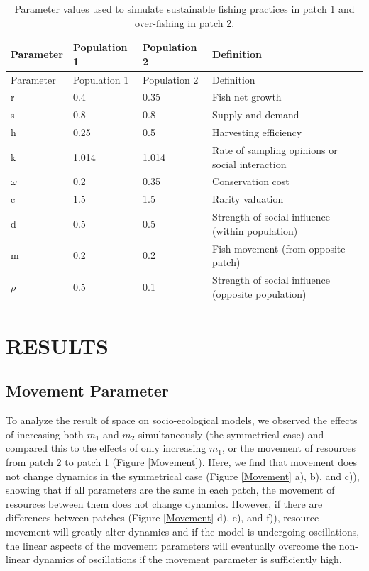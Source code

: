 \documentclass[
  12pt,
]{article}
\begin{document}
\begin{longtable}[]{@{}llll@{}}
\caption{\label{tab:DispersionParamTable}Parameter values used to simulate sustainable fishing practices in patch 1 and over-fishing in patch 2. \label{DispersionParamTable}}\tabularnewline
\toprule\noalign{}
Parameter & Population 1 & Population 2 & Definition \\
\midrule\noalign{}
\endfirsthead
\toprule\noalign{}
Parameter & Population 1 & Population 2 & Definition \\
\midrule\noalign{}
\endhead
\bottomrule\noalign{}
\endlastfoot
r & 0.4 & 0.35 & Fish net growth \\
s & 0.8 & 0.8 & Supply and demand \\
h & 0.25 & 0.5 & Harvesting efficiency \\
k & 1.014 & 1.014 & Rate of sampling opinions or social interaction \\
\(\omega\) & 0.2 & 0.35 & Conservation cost \\
c & 1.5 & 1.5 & Rarity valuation \\
d & 0.5 & 0.5 & Strength of social influence (within population) \\
m & 0.2 & 0.2 & Fish movement (from opposite patch) \\
\(\rho\) & 0.5 & 0.1 & Strength of social influence (opposite population) \\
\end{longtable}

\hypertarget{results}{%
\section{RESULTS}\label{results}}

\hypertarget{movement-parameter}{%
\subsection{Movement Parameter}\label{movement-parameter}}

To analyze the result of space on socio-ecological models, we observed the effects of increasing both \(m_1\) and \(m_2\) simultaneously (the symmetrical case) and compared this to the effects of only increasing \(m_1\), or the movement of resources from patch 2 to patch 1 (Figure \ref{Movement}). Here, we find that movement does not change dynamics in the symmetrical case (Figure \ref{Movement} a), b), and c)), showing that if all parameters are the same in each patch, the movement of resources between them does not change dynamics. However, if there are differences between patches (Figure \ref{Movement} d), e), and f)), resource movement will greatly alter dynamics and if the model is undergoing oscillations, the linear aspects of the movement parameters will eventually overcome the non-linear dynamics of oscillations if the movement parameter is sufficiently high.
\end{document}
